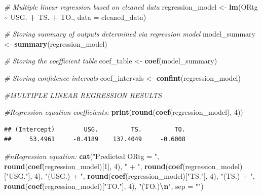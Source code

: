 \documentclass[
]{article}
\newenvironment{Shaded}{\begin{snugshade}}{\end{snugshade}}
\newcommand{\AttributeTok}[1]{\textcolor[rgb]{0.13,0.29,0.53}{#1}}
\newcommand{\CommentTok}[1]{\textcolor[rgb]{0.56,0.35,0.01}{\textit{#1}}}
\newcommand{\DecValTok}[1]{\textcolor[rgb]{0.00,0.00,0.81}{#1}}
\newcommand{\FunctionTok}[1]{\textcolor[rgb]{0.13,0.29,0.53}{\textbf{#1}}}
\newcommand{\NormalTok}[1]{#1}
\newcommand{\OtherTok}[1]{\textcolor[rgb]{0.56,0.35,0.01}{#1}}
\newcommand{\SpecialCharTok}[1]{\textcolor[rgb]{0.81,0.36,0.00}{\textbf{#1}}}
\newcommand{\StringTok}[1]{\textcolor[rgb]{0.31,0.60,0.02}{#1}}
\begin{document}
\begin{Shaded}
\begin{Highlighting}[]
\CommentTok{\# Multiple linear regression based on cleaned data}
\NormalTok{regression\_model }\OtherTok{\textless{}{-}} \FunctionTok{lm}\NormalTok{(ORtg }\SpecialCharTok{\textasciitilde{}}\NormalTok{ USG. }\SpecialCharTok{+}\NormalTok{ TS. }\SpecialCharTok{+}\NormalTok{ TO., }\AttributeTok{data =}\NormalTok{ cleaned\_data)}

\CommentTok{\# Storing summary of outputs determined via regression model}
\NormalTok{model\_summary }\OtherTok{\textless{}{-}} \FunctionTok{summary}\NormalTok{(regression\_model)}

\CommentTok{\# Storing the coefficient table}
\NormalTok{coef\_table }\OtherTok{\textless{}{-}} \FunctionTok{coef}\NormalTok{(model\_summary)}

\CommentTok{\# Storing confidence intervals}
\NormalTok{coef\_intervals }\OtherTok{\textless{}{-}} \FunctionTok{confint}\NormalTok{(regression\_model)}

\CommentTok{\#MULTIPLE LINEAR REGRESSION RESULTS}

\CommentTok{\#Regression equation coefficients:}
\FunctionTok{print}\NormalTok{(}\FunctionTok{round}\NormalTok{(}\FunctionTok{coef}\NormalTok{(regression\_model), }\DecValTok{4}\NormalTok{))}
\end{Highlighting}
\end{Shaded}

\begin{verbatim}
## (Intercept)        USG.         TS.         TO. 
##     53.4961     -0.4189    137.4049     -0.6008
\end{verbatim}

\begin{Shaded}
\begin{Highlighting}[]
\CommentTok{\#nRegression equation:}
\FunctionTok{cat}\NormalTok{(}\StringTok{"Predicted ORtg = "}\NormalTok{,}
    \FunctionTok{round}\NormalTok{(}\FunctionTok{coef}\NormalTok{(regression\_model)[}\DecValTok{1}\NormalTok{], }\DecValTok{4}\NormalTok{), }\StringTok{" + "}\NormalTok{,}
    \FunctionTok{round}\NormalTok{(}\FunctionTok{coef}\NormalTok{(regression\_model)[}\StringTok{"USG."}\NormalTok{], }\DecValTok{4}\NormalTok{), }\StringTok{"(USG.) + "}\NormalTok{,}
    \FunctionTok{round}\NormalTok{(}\FunctionTok{coef}\NormalTok{(regression\_model)[}\StringTok{"TS."}\NormalTok{], }\DecValTok{4}\NormalTok{), }\StringTok{"(TS.) + "}\NormalTok{,}
    \FunctionTok{round}\NormalTok{(}\FunctionTok{coef}\NormalTok{(regression\_model)[}\StringTok{"TO."}\NormalTok{], }\DecValTok{4}\NormalTok{), }\StringTok{"(TO.)}\SpecialCharTok{\textbackslash{}n}\StringTok{"}\NormalTok{,}
    \AttributeTok{sep =} \StringTok{""}\NormalTok{)}
\end{Highlighting}
\end{Shaded}
\end{document}
